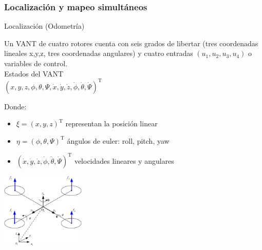 \documentclass[
  24pt, %
  aspectratio=169, %
]{beamer}
\begin{document}

\subsubsection{Localización y mapeo simultáneos}

\begin{frame}{Localización (Odometría)}
  
  \begin{minipage}{0.47\textwidth}
    
    \small Un VANT de cuatro rotores cuenta con seis grados de libertar (tres coordenadas lineales x,y,z, tres coordenadas angulares) y cuatro entradas $(u_1,u_2,u_3,u_4)$ o variables de control.\\
    
    Estados del VANT \\
    $(x,y,z,\phi,\theta,\Psi,\dot{x},\dot{y},\dot{z},\dot{\phi},\dot{\theta},\dot{\Psi})^\mathrm{T}$

    \bigskip %
    
    Donde:
    \begin{itemize}
    \item $\xi = (x,y,z)^\mathrm{T}$ representan la posición linear
    \item $\eta = (\phi,\theta,\Psi)^\mathrm{T}$ ángulos de euler: roll, pitch, yaw
    \item $(\dot{x},\dot{y},\dot{z},\dot{\phi},\dot{\theta},\dot{\Psi})^\mathrm{T}$ velocidades lineares y angulares
    \end{itemize}
  \end{minipage}
  \hspace{0.2cm}
  \begin{minipage}{0.5\textwidth}
    \centering
    \includegraphics[width=4cm]{uav_model.jpeg}
    \bigskip %
  \end{minipage}
\end{frame}
\end{document}
